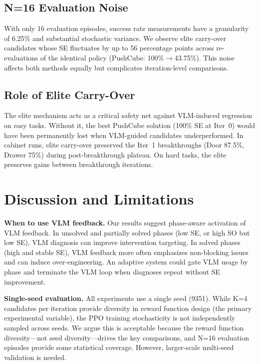 \documentclass[conference]{IEEEtran}
\begin{document}
\subsection{N=16 Evaluation Noise}

With only 16 evaluation episodes, success rate measurements have a granularity
of 6.25\% and substantial stochastic variance. We observe elite carry-over
candidates whose SE fluctuates by up to 56 percentage points across
re-evaluations of the identical policy (PushCube: 100\%$\to$43.75\%). This
noise affects both methods equally but complicates iteration-level comparisons.

\subsection{Role of Elite Carry-Over}

The elite mechanism acts as a critical safety net against VLM-induced regression
on easy tasks. Without it, the best PushCube solution (100\% SE at Iter~0) would
have been permanently lost when VLM-guided candidates underperformed. In cabinet
runs, elite carry-over preserved the Iter~1 breakthroughs (Door 87.5\%, Drawer
75\%) during post-breakthrough plateau. On hard tasks, the elite preserves gains
between breakthrough iterations.


\section{Discussion and Limitations}

\textbf{When to use VLM feedback.}
Our results suggest phase-aware activation of VLM feedback. In unsolved and
partially solved phases (low SE, or high SO but low SE), VLM diagnosis can
improve intervention targeting. In solved phases (high and stable SE), VLM
feedback more often emphasizes non-blocking issues and can induce
over-engineering. An adaptive system could gate VLM usage by phase and
terminate the VLM loop when diagnoses repeat without SE improvement.

\textbf{Single-seed evaluation.}
All experiments use a single seed (9351). While K=4 candidates per iteration
provide diversity in reward function design (the primary experimental variable),
the PPO training stochasticity is not independently sampled across seeds. We
argue this is acceptable because the reward function diversity---not seed
diversity---drives the key comparisons, and N=16 evaluation episodes provide
some statistical coverage. However, larger-scale multi-seed validation is
needed.
\end{document}
